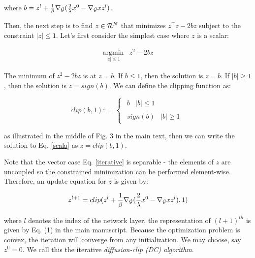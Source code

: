 \documentclass{article}
\begin{document}
where $b = {z^l} + \frac{1}{\beta }{\nabla _{\cal G}}(\frac{2}{\lambda }{x^0} - {\nabla _{\cal G}}x{z^l})$.

Then, the next step is to find $z \in {\cal R} ^N$ that minimizes $z^\intercal z-2bz$ subject to the constraint $|z|\le 1$. Let's first consider the simplest case where $z$ is a scalar:

\begin{equation}
\label{scala}
\begin{array}{*{20}{c}}
{\mathop {\arg \min }\limits_{\left| z \right| \le 1} }&{{z^2} - 2bz}
\end{array}
\end{equation}

The minimum of ${{z^2} - 2bz}$ is at $z=b$. If $b \le 1$, then the solution is $z=b$. If $|b| \ge 1$, then the solution is $z=sign(b)$. We can define the clipping function as:

\begin{equation}
clip(b,1): = \left\{ {\begin{array}{*{20}{c}}
{\begin{array}{*{20}{c}}
b&{\left| b \right| \le 1}
\end{array}}\\
{\begin{array}{*{20}{c}}
{sign(b)}&{\left| b \right| \ge 1}
\end{array}}
\end{array}} \right.
\end{equation}

as illustrated in the middle of Fig. 3 in the main text, then we can write the solution to Eq. \ref{scala} as $z=clip(b,1)$.

Note that the vector case Eq. \ref{iterative} is separable - the elements of $z$ are uncoupled so the constrained minimization can be performed element-wise. Therefore, an update equation for $z$ is given by:

\begin{equation}
{z^{l + 1}} = clip({z^l} + \frac{1}{\beta }{\nabla _{\cal G}}(\frac{2}{\lambda }{x^0} - {\nabla _{\cal G}}x{z^l}),1)
\end{equation}

where $l$ denotes the index of the network layer, the representation of $(l+1)^{th}$ is given by Eq. (1) in the main manuscript. Because the optimization problem is convex, the iteration will converge from any initialization. We may choose, say $z^0=0$. We call this the iterative \textit{ diffusion-clip (DC) algorithm}.
\end{document}
